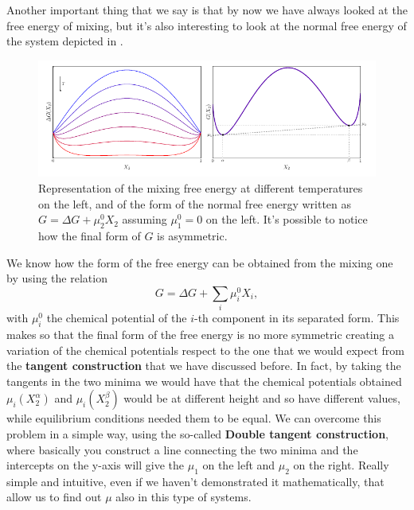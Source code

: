 Another important thing that we say is that by now we have always looked at the free energy of mixing, but it's also interesting to look at the normal free energy of the system depicted in .
\begin{figure}[t]
    \centering
    \includegraphics[width=\textwidth]{Immagini/DoubleTang.pdf}
    \caption
    {
        Representation of the mixing free energy at different temperatures on the left, and of the form of the normal free energy written as $G = \Delta G + \mu^0_2 X_2$ assuming $\mu^0_1 = 0$ on the left. It's possible to notice how the final form of $G$ is asymmetric.
    }
    \label{fig:DoubleTang}
\end{figure}
We know how the form of the free energy can be obtained from the mixing one by using the relation
\begin{equation}
    G = \Delta G + \sum_i \mu_i^0 X_i,
\end{equation}
with $\mu_i^0$ the chemical potential of the $i$-th component in its separated form. This makes so that the final form of the free energy is no more symmetric creating a variation of the chemical potentials respect to the one that we would expect from the \textbf{tangent construction} that we have discussed before. In fact, by taking the tangents in the two minima we would have that the chemical potentials obtained $\mu_i(X_2^\alpha)$ and $\mu_i(X_2^\beta)$ would be at different height and so have different values, while equilibrium conditions needed them to be equal. We can overcome this problem in a simple way, using the so-called \textbf{Double tangent construction}, where basically you construct a line connecting the two minima and the intercepts on the y-axis will give the $\mu_1$ on the left and $\mu_2$ on the right. Really simple and intuitive, even if we haven't demonstrated it mathematically, that allow us to find out $\mu$ also in this type of systems.
